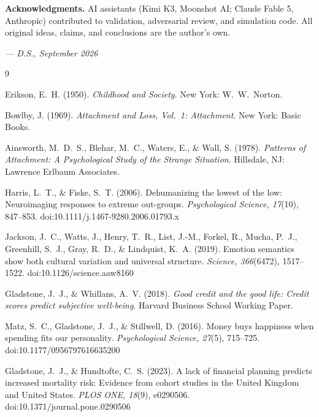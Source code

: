 \documentclass[11pt]{article}
\begin{document}
\noindent\textbf{Acknowledgments.} AI assistants (Kimi K3, Moonshot AI; Claude Fable 5, Anthropic) contributed to validation, adversarial review, and simulation code. All original ideas, claims, and conclusions are the author's own.

\vspace{1.4em}
\begin{flushright}
\emph{--- D.S., September 2026}
\end{flushright}

\begin{thebibliography}{9}
\setlength{\itemsep}{0.3em}

Erikson, E.~H. (1950).
\emph{Childhood and Society}.
New York: W.~W.~Norton.

Bowlby, J. (1969).
\emph{Attachment and Loss, Vol.~1: Attachment}.
New York: Basic Books.

Ainsworth, M.~D.~S., Blehar, M.~C., Waters, E., \& Wall, S. (1978).
\emph{Patterns of Attachment: A Psychological Study of the Strange Situation}.
Hillsdale, NJ: Lawrence Erlbaum Associates.

Harris, L.~T., \& Fiske, S.~T. (2006).
Dehumanizing the lowest of the low: Neuroimaging responses to extreme out-groups.
\emph{Psychological Science, 17}(10), 847--853.
doi:10.1111/j.1467-9280.2006.01793.x

Jackson, J.~C., Watts, J., Henry, T.~R., List, J.-M., Forkel, R., Mucha, P.~J., Greenhill, S.~J., Gray, R.~D., \& Lindquist, K.~A. (2019).
Emotion semantics show both cultural variation and universal structure.
\emph{Science, 366}(6472), 1517--1522.
doi:10.1126/science.aaw8160

Gladstone, J.~J., \& Whillans, A.~V. (2018).
\emph{Good credit and the good life: Credit scores predict subjective well-being}.
Harvard Business School Working Paper.

Matz, S.~C., Gladstone, J.~J., \& Stillwell, D. (2016).
Money buys happiness when spending fits our personality.
\emph{Psychological Science, 27}(5), 715--725.
doi:10.1177/0956797616635200

Gladstone, J.~J., \& Hundtofte, C.~S. (2023).
A lack of financial planning predicts increased mortality risk: Evidence from cohort studies in the United Kingdom and United States.
\emph{PLOS ONE, 18}(9), e0290506.
doi:10.1371/journal.pone.0290506

\end{thebibliography}
\end{document}
